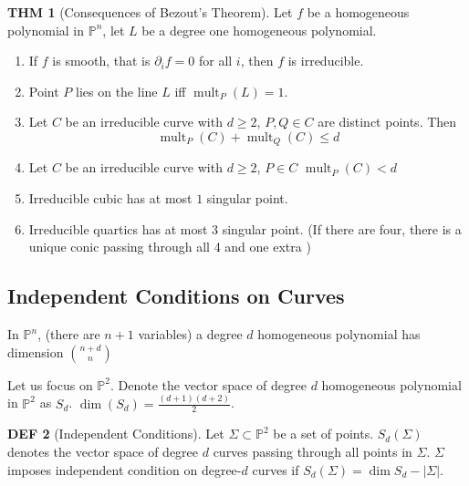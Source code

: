 \documentclass[twocolumn]{article}
\newcommand{\p}{\partial}
\DeclareMathOperator{\mult}{mult}
\renewcommand{\P}{\mathbb{P}}
\theoremstyle{definition}
\newtheorem{thm}{THM}
\newtheorem{defi}[thm]{DEF}
\theoremstyle{remark}
\begin{document}
\begin{thm}[Consequences of Bezout's Theorem]
	Let $f$ be a homogeneous polynomial in $\P^n$, let $L$ be a degree one homogeneous polynomial.
	\begin{enumerate}
		\item If $f$ is smooth, that is $\p_i f = 0$ for all $i$, then $f$ is irreducible.
		\item Point $P$ lies on the line $L$ iff $\mult_P(L) = 1$.
		\item Let $C$ be an irreducible curve with $d \geq 2$, $P, Q \in C$ are distinct points. Then 
			$$\mult_P(C) + \mult_Q(C) \leq d$$
		\item Let $C$ be an irreducible curve with $d \geq 2$, $P \in C$
			$\mult_P(C)  < d$
		\item Irreducible cubic has at most $1$ singular point.
		\item Irreducible quartics has at most $3$ singular point. (If there are four, there is a unique conic passing through all 4 and one extra )
	\end{enumerate}
\end{thm}

\subsection{Independent Conditions on Curves}

In $\P^n$, (there are $n+1$ variables) a degree $d$ homogeneous polynomial has dimension
$\binom{n+d}{n}$ 

Let us focus on $\P^2$. 
Denote the vector space of degree $d$ homogeneous polynomial in $\P^2$ as $S_d$. $\dim(S_d) = \frac{(d+1)(d+2)}{2}$.

\begin{defi}[Independent Conditions]
	Let $\Sigma \subset \P^2$ be a set of points. 
	$S_d(\Sigma)$ denotes the vector space of degree $d$ curves passing through all points in $\Sigma$.
	$\Sigma$ imposes independent condition on degree-$d$ curves if $S_d(\Sigma) = \dim{S_d} - |\Sigma|$.
\end{defi}
\end{document}
